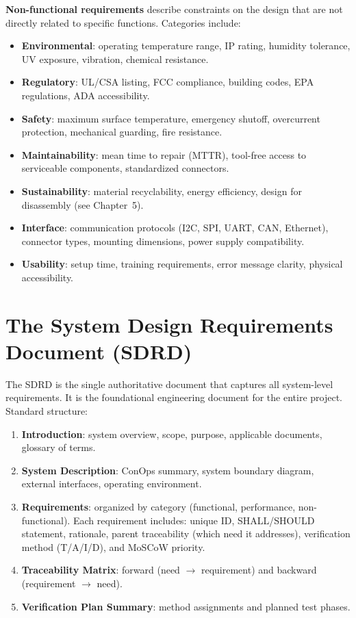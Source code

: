 \textbf{Non-functional requirements} describe constraints on the design that are not directly related to specific functions. Categories include:
\begin{itemize}[nosep,leftmargin=1.5em]
\item \textbf{Environmental}: operating temperature range, IP rating, humidity tolerance, UV exposure, vibration, chemical resistance.
\item \textbf{Regulatory}: UL/CSA listing, FCC compliance, building codes, EPA regulations, ADA accessibility.
\item \textbf{Safety}: maximum surface temperature, emergency shutoff, overcurrent protection, mechanical guarding, fire resistance.
\item \textbf{Maintainability}: mean time to repair (MTTR), tool-free access to serviceable components, standardized connectors.
\item \textbf{Sustainability}: material recyclability, energy efficiency, design for disassembly (see Chapter~5).
\item \textbf{Interface}: communication protocols (I2C, SPI, UART, CAN, Ethernet), connector types, mounting dimensions, power supply compatibility.
\item \textbf{Usability}: setup time, training requirements, error message clarity, physical accessibility.
\end{itemize}

\section{The System Design Requirements Document (SDRD)}
The SDRD is the single authoritative document that captures all system-level requirements. It is the foundational engineering document for the entire project. Standard structure:

\begin{enumerate}[nosep,leftmargin=1.5em]
\item \textbf{Introduction}: system overview, scope, purpose, applicable documents, glossary of terms.
\item \textbf{System Description}: ConOps summary, system boundary diagram, external interfaces, operating environment.
\item \textbf{Requirements}: organized by category (functional, performance, non-functional). Each requirement includes: unique ID, SHALL/SHOULD statement, rationale, parent traceability (which need it addresses), verification method (T/A/I/D), and MoSCoW priority.
\item \textbf{Traceability Matrix}: forward (need $\to$ requirement) and backward (requirement $\to$ need).
\item \textbf{Verification Plan Summary}: method assignments and planned test phases.
\end{enumerate}

